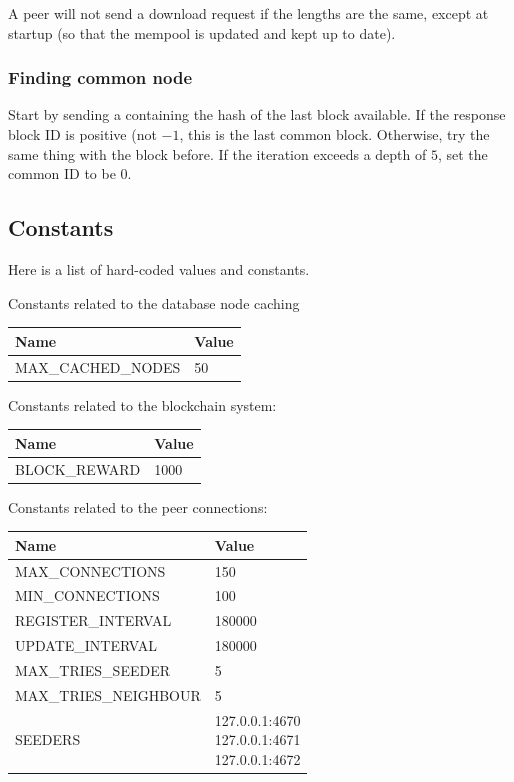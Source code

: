 \documentclass[../documentation.tex]{subfiles}
\begin{document}
A peer will not send a download request if the lengths are the same, except
at startup (so that the mempool is updated and kept up to date).

\subsubsection{Finding common node}

Start by sending a  containing the hash of the last block
available. If the response block ID is positive (not \(-1\), this is the last common block.
Otherwise, try the same thing with the block before. If the iteration exceeds a depth of \(5\),
set the common ID to be 0.

\hypertarget{constants}{}
\subsection{Constants}

Here is a list of hard-coded values and constants.

Constants related to the database node caching

\bgroup{}
\def\arraystretch{1.25}
\begin{tabular}{|l|l|}
    \hline
    \textbf{Name} & \textbf{Value}
    \\ \hline
    MAX\_CACHED\_NODES & 50
    \\ \hline
\end{tabular}
\egroup{}

Constants related to the blockchain system:

\bgroup{}
\def\arraystretch{1.25}
\begin{tabular}{|l|l|}
    \hline
    \textbf{Name} & \textbf{Value}
    \\ \hline
    BLOCK\_REWARD & 1000
    \\ \hline
\end{tabular}
\egroup{}

Constants related to the peer connections:

\bgroup{}
\def\arraystretch{1.25}
\begin{tabular}{|l|l|}
    \hline
    \textbf{Name} & \textbf{Value}
    \\ \hline
    MAX\_CONNECTIONS & 150
    \\ \hline
    MIN\_CONNECTIONS & 100
    \\ \hline
    REGISTER\_INTERVAL & 180000
    \\ \hline
    UPDATE\_INTERVAL & 180000
    \\ \hline
    MAX\_TRIES\_SEEDER & 5
    \\ \hline
    MAX\_TRIES\_NEIGHBOUR & 5
    \\ \hline
    SEEDERS & \makecell[t] {
        127.0.0.1:4670 \\
        127.0.0.1:4671 \\
        127.0.0.1:4672
    }
    \\ \hline
\end{tabular}
\egroup{}
\end{document}
